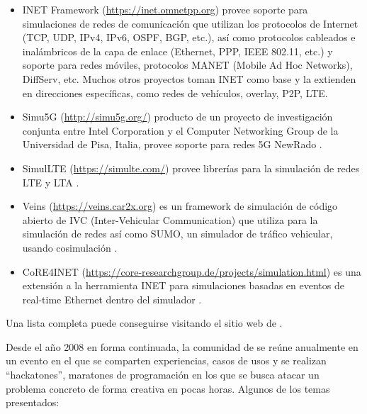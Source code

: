\begin{itemize}
    \item INET Framework (\url{https://inet.omnetpp.org}) provee soporte para
    simulaciones de redes de comunicación que utilizan los protocolos de
    Internet (TCP, UDP, IPv4, IPv6, OSPF, BGP, etc.), así como protocolos
    cableados e inalámbricos de la capa de enlace (Ethernet, PPP, IEEE 802.11,
    etc.) y soporte para redes móviles, protocolos MANET (Mobile Ad Hoc
    Networks), DiffServ, etc. Muchos otros proyectos toman INET como base y la
    extienden en direcciones específicas, como redes de vehículos, overlay,
    P2P, LTE.

    \item Simu5G (\url{http://simu5g.org/}) producto de un proyecto de
    investigación conjunta entre Intel Corporation y el Computer Networking
    Group de la Universidad de Pisa, Italia, provee soporte para redes 5G
    NewRado \cite{Simu5G}.

    \item SimulLTE (\url{https://simulte.com/}) provee librerías para la
    simulación de redes LTE y LTA \cite{SimuLTE}.

    \item Veins (\url{https://veins.car2x.org}) es un framework de simulación
    de código abierto de IVC (Inter-Vehicular Communication) que utiliza
    \omnetpp{} para la simulación de redes así como SUMO, un simulador de
    tráfico vehicular, usando cosimulación \cite{Veins}.

    \item CoRE4INET
    (\url{https://core-researchgroup.de/projects/simulation.html}) es una
    extensión a la herramienta INET para simulaciones basadas en eventos de
    real-time Ethernet dentro del simulador \omnetpp{}.
\end{itemize}

Una lista completa puede conseguirse visitando el sitio web de
\href{https://omnetpp.org/download/models-and-tools}{\omnetpp{}}.

Desde el año 2008 en forma continuada, la comunidad de \omnetpp{} se reúne
anualmente en un evento en el que se comparten experiencias, casos de usos y se
realizan ``hackatones'', maratones de programación en los que se busca atacar
un problema concreto de forma creativa en pocas horas. Algunos de los temas
presentados:

